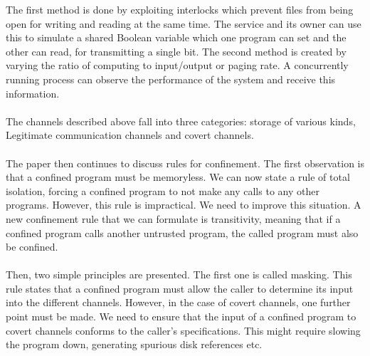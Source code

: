 The first method is done by exploiting interlocks which prevent files from being open for writing and reading at the same time. The service and its owner can use this to simulate a shared Boolean variable which one program can set and the other can read, for transmitting a single bit. The second method is created by varying the ratio of computing to input/output or paging rate. A concurrently running process can observe the performance of the system and receive this information. \\\\
The channels described above fall into three categories: storage of various kinds, Legitimate communication channels and covert channels.\\\\
The paper then continues to discuss rules for confinement. The first observation is that a confined program must be memoryless. We can now state a rule of total isolation, forcing a confined program to not make any calls to any other programs. However, this rule is impractical. We need to improve this situation. A new confinement rule that we can formulate is transitivity, meaning that if a confined program calls another untrusted program, the called program must also be confined.\\\\
Then, two simple principles are presented. The first one is called masking. This rule states that a confined program must allow the caller to determine its input into the different channels. However, in the case of covert channels, one further point must be made. We need to ensure that the input of a confined program to covert channels conforms to the caller's specifications. This might require slowing the program down, generating spurious disk references etc.


